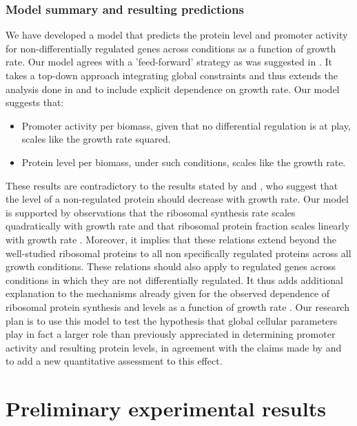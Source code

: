 \documentclass[a4page,notitlepage]{article}
\begin{document}
\subsubsection{Model summary and resulting predictions}
We have developed a model that predicts the protein level and promoter activity for non-differentially regulated genes across conditions as a function of growth rate.
Our model agrees with a 'feed-forward' strategy as was suggested in \parencite{Levy2009}.
It takes a top-down approach integrating global constraints and thus extends the analysis done in \parencite{Leeat2013} and \parencite{Maaloe1969} to include explicit dependence on growth rate.
Our model suggests that:
\begin{itemize}
\item Promoter activity per biomass, given that no differential regulation is at play, scales like the growth rate squared.
\item Protein level per biomass, under such conditions, scales like the growth rate.
\end{itemize}
These results are contradictory to the results stated by \parencite{Klumpp2009a} and \parencite{Scott2010b}, who suggest that the level of a non-regulated protein should decrease with growth rate.
Our model is supported by observations that the ribosomal synthesis rate scales quadratically with growth rate \parencite{Zaslaver2009a} and that ribosomal protein fraction scales linearly with growth rate \parencite{Maaloe1969,ingraham1983growth}.
Moreover, it implies that these relations extend beyond the well-studied ribosomal proteins to all non specifically regulated proteins across all growth conditions.
These relations should also apply to regulated genes across conditions in which they are not differentially regulated.
It thus adds additional explanation to the mechanisms already given for the observed dependence of ribosomal protein synthesis and levels as a function of growth rate \parencite{Zaslaver2009a}.
Our research plan is to use this model to test the hypothesis that global cellular parameters play in fact a larger role than previously appreciated in determining promoter activity and resulting protein levels, in agreement with the claims made by \parencite{Berthoumieux2013,Leeat2013,loven2012,Scott2010b,Klumpp2009a} and to add a new quantitative assessment to this effect.
\section{Preliminary experimental results}
\end{document}
